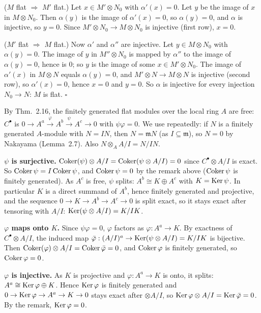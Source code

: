 \documentclass[11pt]{article}
\begin{document}
($M$ flat $\Rightarrow$ $M'$ flat.) Let $x\in M'\otimes N_0$ with $\alpha'(x)=0$. Let $y$ be the image of $x$ in $M\otimes N_0$. Then $\alpha(y)$ is the image of $\alpha'(x)=0$, so $\alpha(y)=0$, and $\alpha$ is injective, so $y=0$. Since $M'\otimes N_0\to M\otimes N_0$ is injective (first row), $x=0$.

($M'$ flat $\Rightarrow$ $M$ flat.) Now $\alpha'$ and $\alpha''$ are injective. Let $y\in M\otimes N_0$ with $\alpha(y)=0$. The image of $y$ in $M''\otimes N_0$ is mapped by $\alpha''$ to the image of $\alpha(y)=0$, hence is $0$; so $y$ is the image of some $x\in M'\otimes N_0$. The image of $\alpha'(x)$ in $M\otimes N$ equals $\alpha(y)=0$, and $M'\otimes N\to M\otimes N$ is injective (second row), so $\alpha'(x)=0$, hence $x=0$ and $y=0$. So $\alpha$ is injective for every injection $N_0\to N$: $M$ is flat. \hfill$\square$

\pf
By Thm.~2.16, the finitely generated flat modules over the local ring $A$ are free: $C^\bullet$ is $0\to A^a\xrightarrow{\varphi}A^b\xrightarrow{\psi}A^c\to0$ with $\psi\varphi=0$. We use repeatedly: if $N$ is a finitely generated $A$-module with $N=IN$, then $N=\mathfrak mN$ (as $I\subseteq\mathfrak m$), so $N=0$ by Nakayama (Lemma~2.7). Also $N\otimes_AA/I=N/IN$.

\textbf{$\psi$ is surjective.} $\operatorname{Coker}(\psi)\otimes A/I=\operatorname{Coker}(\psi\otimes A/I)=0$ since $C^\bullet\otimes A/I$ is exact. So $\operatorname{Coker}\psi=I\operatorname{Coker}\psi$, and $\operatorname{Coker}\psi=0$ by the remark above ($\operatorname{Coker}\psi$ is finitely generated). As $A^c$ is free, $\psi$ splits: $A^b\cong K\oplus A^c$ with $K=\operatorname{Ker}\psi$. In particular $K$ is a direct summand of $A^b$, hence finitely generated and projective, and the sequence $0\to K\to A^b\to A^c\to 0$ is split exact, so it stays exact after tensoring with $A/I$: $\operatorname{Ker}(\psi\otimes A/I)=K/IK$.

\textbf{$\varphi$ maps onto $K$.} Since $\psi\varphi=0$, $\varphi$ factors as $\varphi:A^a\to K$. By exactness of $C^\bullet\otimes A/I$, the induced map $\bar\varphi:(A/I)^a\to \operatorname{Ker}(\psi\otimes A/I)=K/IK$ is bijective. Then $\operatorname{Coker}(\varphi)\otimes A/I=\operatorname{Coker}\bar\varphi=0$, and $\operatorname{Coker}\varphi$ is finitely generated, so $\operatorname{Coker}\varphi=0$.

\textbf{$\varphi$ is injective.} As $K$ is projective and $\varphi:A^a\to K$ is onto, it splits: $A^a\cong \operatorname{Ker}\varphi\oplus K$. Hence $\operatorname{Ker}\varphi$ is finitely generated and $0\to\operatorname{Ker}\varphi\to A^a\to K\to0$ stays exact after $\otimes A/I$, so $\operatorname{Ker}\varphi\otimes A/I=\operatorname{Ker}\bar\varphi=0$. By the remark, $\operatorname{Ker}\varphi=0$.
\end{document}
